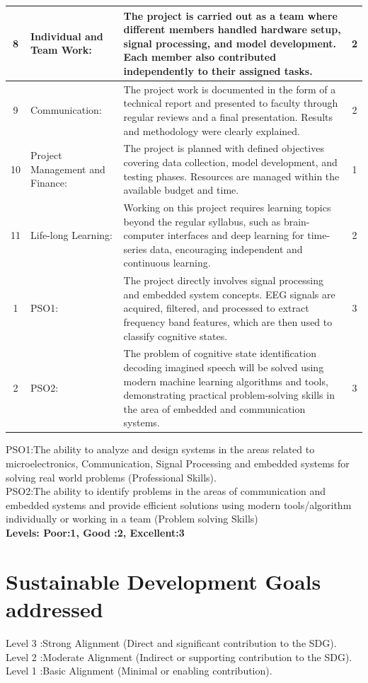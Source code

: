\begin{appendices}
\begin{longtable}{|c|p{4cm}|p{7.5cm}|c|}
\hline
8 & Individual and Team Work: & The project is carried out as a team where different members handled hardware setup, signal processing, and model development. Each member also contributed independently to their assigned tasks. & 2 \\
\hline
9 & Communication: & The project work is documented in the form of a technical report and presented to faculty through regular reviews and a final presentation. Results and methodology were clearly explained. & 2 \\
\hline
10 & Project Management and Finance: & The project is planned with defined objectives covering data collection, model development, and testing phases. Resources are managed within the available budget and time. & 1 \\
\hline
11 & Life-long Learning: & Working on this project requires learning topics beyond the regular syllabus, such as brain-computer interfaces and deep learning for time-series data, encouraging independent and continuous learning. & 2 \\
\hline
1 & PSO1: & The project directly involves signal processing and embedded system concepts. EEG signals are acquired, filtered, and processed to extract frequency band features, which are then used to classify cognitive states. & 3 \\
\hline
2 & PSO2: & The problem of cognitive state identification decoding imagined speech will be solved using modern machine learning algorithms and tools, demonstrating practical problem-solving skills in the area of embedded and communication systems. & 3 \\
\hline
\end{longtable}


PSO1:The ability to analyze and design systems in the areas related to microelectronics, Communication, Signal Processing and embedded systems for solving real world problems (Professional Skills).\\
PSO2:The ability to identify problems in the areas of communication and embedded systems and provide efficient solutions using modern tools/algorithm individually or working in a team (Problem solving Skills)
 \\ {\bf Levels: Poor:1, Good :2, Excellent:3}



\chapter{Sustainable Development Goals addressed}
  Level 3 :Strong Alignment (Direct and significant contribution to the SDG).\\
Level 2 :Moderate Alignment (Indirect or supporting contribution to the SDG).\\
Level 1 :Basic Alignment (Minimal or enabling contribution).\\


\end{appendices}
